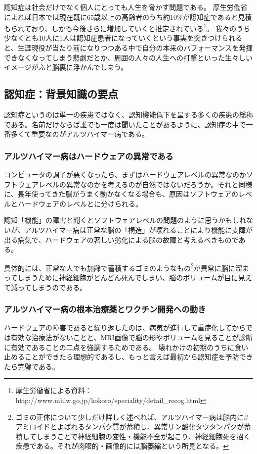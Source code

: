 認知症は社会だけでなく個人にとっても人生を脅かす問題である。
厚生労働省によれば日本では現在既に65歳以上の高齢者のうち約10\%が認知症であると見積もられており、しかも今後さらに増加していくと推定されている\footnote{厚生労働省による資料：http://www.mhlw.go.jp/kokoro/speciality/detail\_recog.html
}。
我々のうち少なくとも10人に1人は認知症患者になっていくという事実を突きつけられると、生涯現役が当たり前になりつつある中で自分の本来のパフォーマンスを発揮できなくなってしまう悲劇だとか、周囲の人々の人生への打撃といった生々しいイメージがふと脳裏に浮かんでしまう。

\subsection{認知症：背景知識の要点}
認知症というのは単一の疾患ではなく、認知機能低下を呈する多くの疾患の総称である。名前だけならば誰でも一度は聞いたことがあるように、認知症の中で一番多くて重要なのがアルツハイマー病である。

\subsubsection{アルツハイマー病はハードウェアの異常である}
コンピュータの調子が悪くなったら、まずはハードウェアレベルの異常なのかソフトウェアレベルの異常なのかを考えるのが自然ではないだろうか。それと同様に、長年使ってきた脳がうまく動かなくなる場合も、原因はソフトウェアのレベルとハードウェアのレベルとに分けられる。

認知「機能」の障害と聞くとソフトウェアレベルの問題のように思うかもしれないが、アルツハイマー病は正常な脳の「構造」が壊れることにより機能に支障が出る病気で、ハードウェアの著しい劣化による脳の故障と考えるべきものである。

具体的には、正常な人でも加齢で蓄積するゴミのようなもの\footnote{ゴミの正体について少しだけ詳しく述べれば、アルツハイマー病は脳内に$\beta$アミロイドとよばれるタンパク質が蓄積し、異常リン酸化タウタンパクが蓄積してしまうことで神経細胞の変性・機能不全が起こり、神経細胞死を招く疾患である。それが肉眼的・画像的には脳萎縮という所見となる。}が異常に脳に溜まってしまうために神経細胞がどんどん死んでしまい、脳のボリュームが目に見えて減ってしまうのである。

\subsubsection{アルツハイマー病の根本治療薬とワクチン開発への動き}
ハードウェアの障害であると繰り返したのは、病気が進行して重症化してからでは有効な治療法がないことと、MRI画像で脳の形やボリュームを見ることが診断に有効であることの二点を強調するためである。
壊れかけの初期のうちに食い止めることができたら理想的であるし、もっと言えば最初から認知症を予防できたら完璧である。

